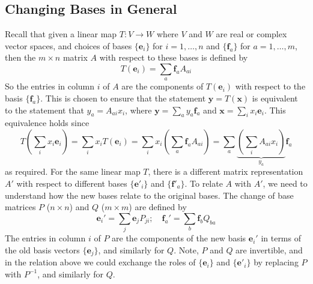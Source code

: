 \documentclass{article}
\begin{document}
\subsection{Changing Bases in General}
Recall that given a linear map $T\colon V \to W$ where $V$ and $W$ are real or complex vector spaces, and choices of bases $\{ \bm e_i \}$ for $i = 1, \dots, n$ and $\{\bm f_a \}$ for $a = 1, \dots, m$, then the $m \times n$ matrix $A$ with respect to these bases is defined by
\[ T(\bm e_i) = \sum_a \bm f_a A_{ai} \]
So the entries in column $i$ of $A$ are the components of $T(\bm e_i)$ with respect to the basis $\{ \bm f_a \}$. This is chosen to ensure that the statement $\bm y = T(\bm x)$ is equivalent to the statement that $y_a = A_{ai}x_i$, where $\bm y = \sum_a y_a \bm f_a$ and $\bm x = \sum_i x_i \bm e_i$. This equivalence holds since
\[ T\left(\sum_i x_i \bm e_i \right) = \sum_i x_i T(\bm e_i) = \sum_i x_i \left( \sum_a \bm f_a A_{ai} \right) = \sum_a \underbrace{\left( \sum_i A_{ai} x_i \right)}_{y_a} \bm f_a \]
as required. For the same linear map $T$, there is a different matrix representation $A'$ with respect to different bases $\{ \bm e'_i \}$ and $\{ \bm f'_a \}$. To relate $A$ with $A'$, we need to understand how the new bases relate to the original bases. The change of base matrices $P$ ($n \times n$) and $Q$ ($m \times m$) are defined by
\[ \bm e_i' = \sum_j \bm e_j P_{ji};\quad \bm f_a' = \sum_b \bm f_b Q_{ba} \]
The entries in column $i$ of $P$ are the components of the new basis $\bm e_i'$ in terms of the old basis vectors $\{ \bm e_j \}$, and similarly for $Q$. Note, $P$ and $Q$ are invertible, and in the relation above we could exchange the roles of $\{ \bm e_i \}$ and $\{ \bm e'_i \}$ by replacing $P$ with $P^{-1}$, and similarly for $Q$.
\end{document}
